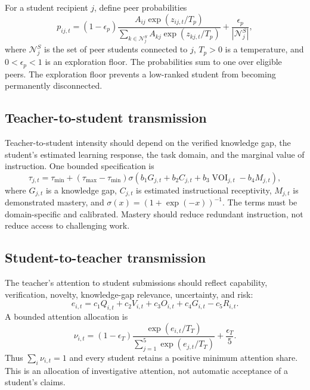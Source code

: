 \documentclass[11pt,a4paper]{article}
\begin{document}
For a student recipient \(j\), define peer probabilities
\begin{equation}
p_{ij,t}
=
(1-\epsilon_p)
\frac{A_{ij}\exp(z_{ij,t}/T_p)}
{\sum_{k\in\mathcal N_j^S}A_{kj}\exp(z_{kj,t}/T_p)}
+
\frac{\epsilon_p}{|\mathcal N_j^S|},
\end{equation}
where \(\mathcal N_j^S\) is the set of peer students connected to \(j\), \(T_p>0\) is a temperature, and \(0<\epsilon_p<1\) is an exploration floor. The probabilities sum to one over eligible peers. The exploration floor prevents a low-ranked student from becoming permanently disconnected.

\subsection{Teacher-to-student transmission}

Teacher-to-student intensity should depend on the verified knowledge gap, the student's estimated learning response, the task domain, and the marginal value of instruction. One bounded specification is
\begin{equation}
\tau_{j,t}
=
\tau_{\min}
+
(\tau_{\max}-\tau_{\min})
\sigma\left(
b_1G_{j,t}
+b_2C_{j,t}
+b_3\operatorname{VOI}_{j,t}
-b_4M_{j,t}
\right),
\end{equation}
where \(G_{j,t}\) is a knowledge gap, \(C_{j,t}\) is estimated instructional receptivity, \(M_{j,t}\) is demonstrated mastery, and \(\sigma(x)=(1+\exp(-x))^{-1}\). The terms must be domain-specific and calibrated. Mastery should reduce redundant instruction, not reduce access to challenging work.

\subsection{Student-to-teacher transmission}

The teacher's attention to student submissions should reflect capability, verification, novelty, knowledge-gap relevance, uncertainty, and risk:
\begin{equation}
e_{i,t}
=
c_1Q_{i,t}
+c_2V_{i,t}
+c_3O_{i,t}
+c_4G_{i,t}
-c_5R_{i,t}.
\end{equation}
A bounded attention allocation is
\begin{equation}
\nu_{i,t}
=
(1-\epsilon_T)
\frac{\exp(e_{i,t}/T_T)}
{\sum_{j=1}^{5}\exp(e_{j,t}/T_T)}
+
\frac{\epsilon_T}{5}.
\end{equation}
Thus \(\sum_i\nu_{i,t}=1\) and every student retains a positive minimum attention share. This is an allocation of investigative attention, not automatic acceptance of a student's claims.
\end{document}
